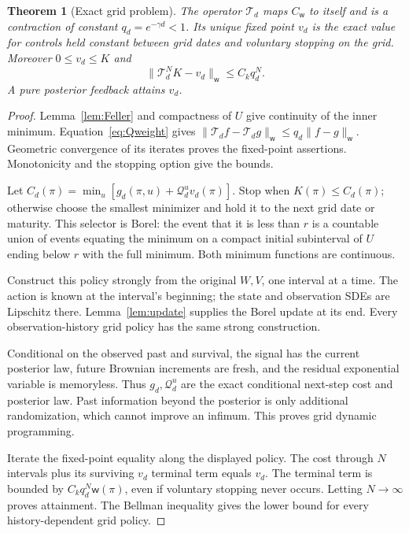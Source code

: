 \documentclass[11pt,a4paper]{article}
\newtheorem{theorem}{Theorem}[section]
\theoremstyle{definition}
\theoremstyle{remark}
\newcommand{\CW}{C_{\mathsf w}}
\newcommand{\wt}{\mathsf w}
\newcommand{\cQ}{\mathcal Q}
\newcommand{\cT}{\mathcal T}
\begin{document}
\begin{theorem}[Exact grid problem]\label{thm:grid}
The operator \(\cT_d\) maps \(\CW\) to itself and is a contraction
of constant \(q_d=e^{-\gamma d}<1\). Its unique fixed point \(v_d\)
is the exact value for controls held constant between grid dates
and voluntary stopping on the grid. Moreover \(0\leq v_d\leq K\) and
\begin{equation}\label{eq:griderror}
 \|\cT_d^NK-v_d\|_{\wt}\leq C_kq_d^N.
\end{equation}
A pure posterior feedback attains \(v_d\).
\end{theorem}
\begin{proof}
Lemma~\ref{lem:Feller} and compactness of \(U\) give continuity of
the inner minimum. Equation~\eqref{eq:Qweight} gives
\(\|\cT_df-\cT_dg\|_{\wt}\leq q_d\|f-g\|_{\wt}\).
Geometric convergence of its iterates proves the fixed-point
assertions. Monotonicity and the stopping option give the bounds.

Let \(C_d(\pi)=\min_u[g_d(\pi,u)+\cQ_d^uv_d(\pi)]\).
Stop when \(K(\pi)\leq C_d(\pi)\); otherwise choose the smallest
minimizer and hold it to the next grid date or maturity.
This selector is Borel: the event that it is less than \(r\) is a
countable union of events equating the minimum on a compact initial
subinterval of \(U\) ending below \(r\) with the full minimum.
Both minimum functions are continuous.

Construct this policy strongly from the original \(W,V\), one
interval at a time. The action is known at the interval's beginning;
the state and observation SDEs are Lipschitz there.
Lemma~\ref{lem:update} supplies the Borel update at its end.
Every observation-history grid policy has the same strong construction.

Conditional on the observed past and survival, the signal has the
current posterior law, future Brownian increments are fresh, and
the residual exponential variable is memoryless. Thus \(g_d,\cQ_d^u\)
are the exact conditional next-step cost and posterior law. Past
information beyond the posterior is only additional randomization,
which cannot improve an infimum. This proves grid dynamic programming.

Iterate the fixed-point equality along the displayed policy.
The cost through \(N\) intervals plus its surviving \(v_d\) terminal
term equals \(v_d\). The terminal term is bounded by
\(C_kq_d^N\wt(\pi)\), even if voluntary stopping never occurs.
Letting \(N\to\infty\) proves attainment. The Bellman inequality
gives the lower bound for every history-dependent grid policy.
\end{proof}
\end{document}

